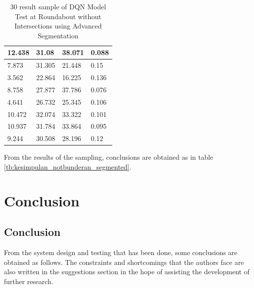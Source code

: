 \documentclass[conference]{IEEEtran}
\begin{document}
\begin{table}[H]
\begin{tabular}{|l|l|l|l|}
			12.438          & 31.08  & 38.071 & 0.088  \\ \hline
			7.873           & 31.305 & 21.448 & 0.15   \\ \hline
			3.562           & 22.864 & 16.225 & 0.136  \\ \hline
			8.758           & 27.877 & 37.786 & 0.076  \\ \hline
			4.641           & 26.732 & 25.345 & 0.106  \\ \hline
			10.472          & 32.074 & 33.322 & 0.101  \\ \hline
			10.937          & 31.784 & 33.864 & 0.095  \\ \hline
			9.244           & 30.508 & 28.196 & 0.12   \\ \hline
		\end{tabular}
		\caption{30 result sample of DQN Model Test at Roundabout without Intersections using Advanced Segmentation}
		\label{tb:hasilpengujian_notbunderan_segmented}
	\end{table}
	
	From the results of the sampling, conclusions are obtained as in table \ref{tb:kesimpulan_notbunderan_segmented}.
	
	\begin{table}[H]
		\caption{Summary of DQN Model Test at Roundabout without Intersections using Advanced Segmentation}
		\label{tb:kesimpulan_notbunderan_segmented}
	\end{table}
	
	
	\section{Conclusion}
	\vspace{1ex}
	
	\subsection{Conclusion}
	\label{sec:kesimpulan}
	
	From the system design and testing that has been done, some conclusions are obtained as follows. The constraints and shortcomings that the authors face are also written in the suggestions section in the hope of assisting the development of further research.
	
\end{document}
